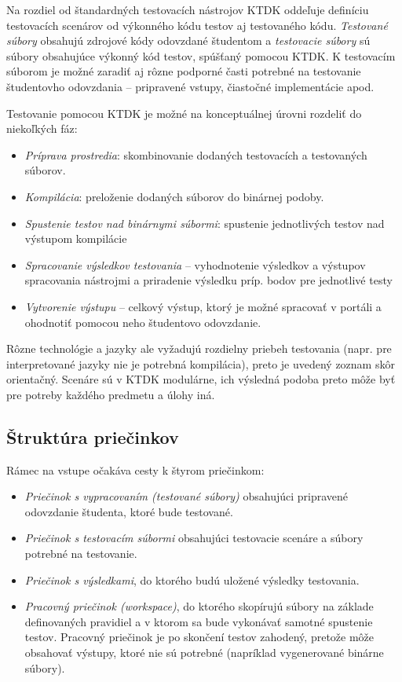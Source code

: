 \documentclass[
  digital, %
  twoside, %
  table,   %
  lof,     %
  lot,     %
]{fithesis3}
\begin{document}
Na rozdiel od štandardných testovacích nástrojov KTDK oddeľuje definíciu testovacích scenárov od výkonného kódu testov aj testovaného kódu. \emph{Testované súbory} obsahujú zdrojové kódy odovzdané študentom a \emph{testovacie súbory} sú súbory obsahujúce výkonný kód testov, spúšťaný pomocou KTDK. K testovacím súborom je možné zaradiť aj rôzne podporné časti potrebné na testovanie študentovho odovzdania -- pripravené vstupy, čiastočné implementácie apod.

Testovanie pomocou KTDK je možné na konceptuálnej úrovni rozdeliť do niekoľkých fáz:
\begin{itemize}
    \item \emph{Príprava prostredia}: skombinovanie dodaných testovacích a testovaných súborov.
    \item \emph{Kompilácia}: preloženie dodaných súborov do binárnej podoby.
    \item \emph{Spustenie testov nad binárnymi súbormi}: spustenie jednotlivých testov nad výstupom kompilácie
    \item \emph{Spracovanie výsledkov testovania} -- vyhodnotenie výsledkov a výstupov spracovania nástrojmi a priradenie výsledku príp. bodov pre jednotlivé testy
    \item \emph{Vytvorenie výstupu} -- celkový výstup, ktorý je možné spracovať v portáli a ohodnotiť pomocou neho študentovo odovzdanie.
\end{itemize}

Rôzne technológie a jazyky ale vyžadujú rozdielny priebeh testovania (napr. pre interpretované jazyky nie je potrebná kompilácia), preto je uvedený zoznam skôr orientačný. Scenáre sú v KTDK modulárne, ich výsledná podoba preto môže byť pre potreby každého predmetu a úlohy iná. 

\subsection{Štruktúra priečinkov}

Rámec na vstupe očakáva cesty k štyrom priečinkom:
\begin{itemize}
    \item \emph{Priečinok s vypracovaním (testované súbory)} obsahujúci pripravené odovzdanie študenta, ktoré bude testované.
    \item \emph{Priečinok s testovacím súbormi} obsahujúci testovacie scenáre a súbory potrebné na testovanie.
    \item \emph{Priečinok s výsledkami}, do ktorého budú uložené výsledky testovania.
    \item \emph{Pracovný priečinok (workspace)}, do ktorého skopírujú súbory na základe definovaných pravidiel a v ktorom sa bude vykonávať samotné spustenie testov. Pracovný priečinok je po skončení testov zahodený, pretože môže obsahovať výstupy, ktoré nie sú potrebné (napríklad vygenerované binárne súbory).
\end{itemize}
\end{document}
